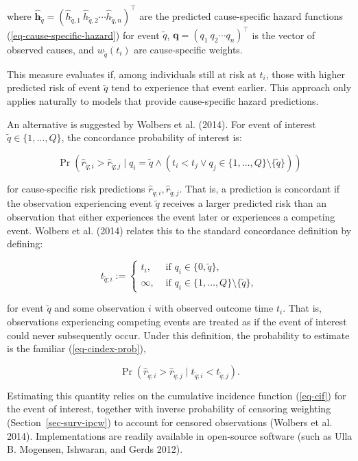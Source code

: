 \documentclass[
  letterpaper,
  krantz2]{style/krantz}
\begin{document}
where
\(\mathbf{\hat{h}}_{\tilde{q}} = (\hat{h}_{\tilde{q},1} \ \hat{h}_{\tilde{q},2} \cdots \hat{h}_{\tilde{q},n})^\top\)
are the predicted cause-specific hazard functions
(\ref{eq-cause-specific-hazard}) for event \(\tilde{q}\),
\(\boldsymbol{\mathbf{q}} = ({q}_1 \ {q}_2 \cdots {q}_{n})^\top\) is the
vector of observed causes, and \(w_{\tilde{q}}(t_i)\) are cause-specific
weights.

This measure evaluates if, among individuals still at risk at \(t_i\),
those with higher predicted risk of event \(\tilde{q}\) tend to
experience that event earlier. This approach only applies naturally to
models that provide cause-specific hazard predictions.

An alternative is suggested by Wolbers et al. (2014). For event of
interest \(\tilde{q} \in \{1,\ldots,Q\}\), the concordance probability
of interest is:

\[
\Pr(\hat{r}_{\tilde{q};i} > \hat{r}_{\tilde{q};j} \mid q_i = \tilde{q} \wedge (t_i < t_j \vee q_j \in \{1,\ldots,Q\} \setminus \{\tilde{q}\}))
\]

for cause-specific risk predictions
\(\hat{r}_{\tilde{q};i}, \hat{r}_{\tilde{q};j}\). That is, a prediction
is concordant if the observation experiencing event \(\tilde{q}\)
receives a larger predicted risk than an observation that either
experiences the event later or experiences a competing event. Wolbers et
al. (2014) relates this to the standard concordance definition by
defining:

\[
t_{\tilde{q};i} :=
\begin{cases}
t_i, & \text{ if } q_i \in \{0, \tilde{q}\},\\
\infty, & \text{ if } q_i \in \{1, \ldots,Q\} \setminus \{\tilde{q}\},
\end{cases}
\]

for event \(\tilde{q}\) and some observation \(i\) with observed outcome
time \(t_i\). That is, observations experiencing competing events are
treated as if the event of interest could never subsequently occur.
Under this definition, the probability to estimate is the familiar
(\ref{eq-cindex-prob}),

\[
\Pr(\hat{r}_{\tilde{q};i} > \hat{r}_{\tilde{q};j} \mid t_{\tilde{q};i} < t_{\tilde{q};j}).
\]

Estimating this quantity relies on the cumulative incidence
function (\ref{eq-cif}) for the
event of interest, together with inverse probability of censoring
weighting (Section~\ref{sec-surv-ipcw}) to account for censored
observations (Wolbers et al. 2014). Implementations are readily
available in open-source software (such as Ulla B. Mogensen, Ishwaran,
and Gerds 2012).
\end{document}
